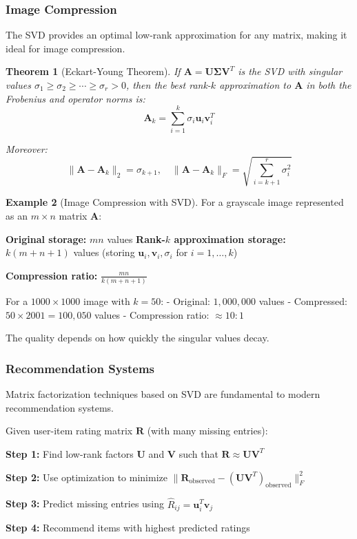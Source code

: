 \documentclass[12pt]{article}
\numberwithin{equation}{section}
\newcommand{\vect}[1]{\boldsymbol{#1}}   %
\newcommand{\mat}[1]{\mathbf{#1}}        %
\theoremstyle{plain}
\newtheorem{theorem}{Theorem}[section]
\theoremstyle{definition}
\newtheorem{example}[theorem]{Example}
\theoremstyle{remark}
\begin{document}
\subsubsection{Image Compression}

The SVD provides an optimal low-rank approximation for any matrix, making it ideal for image compression.

\begin{theorem}[Eckart-Young Theorem]
If $\mat{A} = \mat{U}\mat{\Sigma}\mat{V}^T$ is the SVD with singular values $\sigma_1 \geq \sigma_2 \geq \cdots \geq \sigma_r > 0$, then the best rank-$k$ approximation to $\mat{A}$ in both the Frobenius and operator norms is:
$$\mat{A}_k = \sum_{i=1}^k \sigma_i \vect{u}_i \vect{v}_i^T$$

Moreover:
$$\|\mat{A} - \mat{A}_k\|_2 = \sigma_{k+1}, \quad \|\mat{A} - \mat{A}_k\|_F = \sqrt{\sum_{i=k+1}^r \sigma_i^2}$$
\end{theorem}

\begin{example}[Image Compression with SVD]
For a grayscale image represented as an $m \times n$ matrix $\mat{A}$:

\textbf{Original storage:} $mn$ values
\textbf{Rank-$k$ approximation storage:} $k(m + n + 1)$ values (storing $\vect{u}_i, \vect{v}_i, \sigma_i$ for $i = 1, \ldots, k$)

\textbf{Compression ratio:} $\frac{mn}{k(m+n+1)}$

For a $1000 \times 1000$ image with $k = 50$:
- Original: $1,000,000$ values
- Compressed: $50 \times 2001 = 100,050$ values  
- Compression ratio: $\approx 10:1$

The quality depends on how quickly the singular values decay.
\end{example}

\subsubsection{Recommendation Systems}

Matrix factorization techniques based on SVD are fundamental to modern recommendation systems.

\begin{algorithm}[H]
\caption{Collaborative Filtering via Matrix Factorization}
Given user-item rating matrix $\mat{R}$ (with many missing entries):

\textbf{Step 1:} Find low-rank factors $\mat{U}$ and $\mat{V}$ such that $\mat{R} \approx \mat{U}\mat{V}^T$

\textbf{Step 2:} Use optimization to minimize $\|\mat{R}_{\text{observed}} - (\mat{U}\mat{V}^T)_{\text{observed}}\|_F^2$

\textbf{Step 3:} Predict missing entries using $\hat{R}_{ij} = \vect{u}_i^T\vect{v}_j$

\textbf{Step 4:} Recommend items with highest predicted ratings
\end{algorithm}
\end{document}

